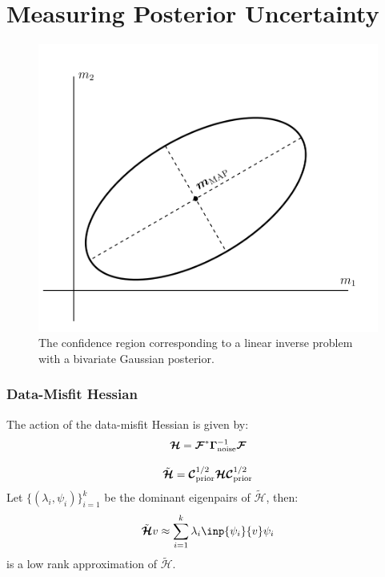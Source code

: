 \documentclass[
  pdf,
  10pt,
  xcolor={svgnames},
]{beamer}
\newcommand{\mcb}[1]{\boldsymbol{\mathcal{#1}}}
\newcommand{\mat}[1]{\mathbf{{#1}}}
\begin{document}
\section{Measuring Posterior Uncertainty}
\begin{frame}
  \begin{figure}
    \centering
    \includegraphics[width=.65\textwidth]{./resources/bivariate}
    \caption{
      The confidence region corresponding to a linear inverse problem with a
      bivariate Gaussian posterior.
    }
  \end{figure}
\end{frame}

\begin{frame}
  \frametitle{Data-Misfit Hessian}
  \begin{definition}
    The action of the data-misfit Hessian is given by:
    \begin{equation*}
      \mcb{H} = \mcb{F}^* \mat{\Gamma}_{\rm noise}^{-1} \mcb{F}
    \end{equation*}
  \end{definition}
  \pause
  \begin{definition}
    \begin{equation*}
      \tilde{\mcb{H}}
      = \mcb{C}_{\rm prior}^{1/2} \mcb{H} \mcb{C}_{\rm prior}^{1/2}
    \end{equation*}
    Let $\{(\lambda_i, \psi_i)\}_{i=1}^k$ be the dominant eigenpairs of
    $\tilde{\mcb{H}}$, then:
    \[
      \tilde{\mcb{H}} v \approx \sum_{i=1}^k \lambda_i \inp{\psi_i}{v} \psi_i
    \]
    is a low rank approximation of $\tilde{\mcb{H}}$.
  \end{definition}
\end{frame}
\end{document}
